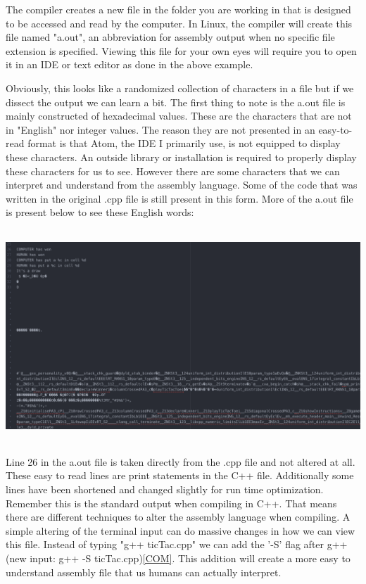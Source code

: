 \documentclass{article}
\theoremstyle{theorem}
\theoremstyle{definition}
\theoremstyle{remark}
\begin{document}
The compiler creates a new file in the folder you are working in that is designed to be accessed and read by the computer. In Linux, the compiler will create this file named "a.out", an abbreviation for assembly output when no specific file extension is specified. Viewing this file for your own eyes will require you to open it in an IDE or text editor as done in the above example. 

Obviously, this looks like a randomized collection of characters in a file but if we dissect the output we can learn a  bit. The first thing to note is the a.out file is mainly constructed of hexadecimal values. These are the characters that are not in "English" nor integer values. The reason they are not presented in an easy-to-read format is that Atom, the IDE I primarily use, is not equipped to display these characters. An outside library or installation is required to properly display these characters for us to see. However there are some characters that we can interpret and understand from the assembly language. Some of the code that was written in the original .cpp file is still present in this form. More of the a.out file is present below to see these English words:

\medskip\begin{center}
\includegraphics[width=16cm, height=8cm]{Pic3.png}
\end{center}

Line 26 in the a.out file is taken directly from the .cpp file and not altered at all. These easy to read lines are print statements in the C++ file. Additionally some lines have been shortened and changed slightly for run time optimization. Remember this is the standard output when compiling in C++. That means there are different techniques to alter the assembly language when compiling. A simple altering of the terminal input can do massive changes in how we can view this file. Instead of typing "g++ ticTac.cpp" we can add the '-S' flag after g++ (new input: g++ -S ticTac.cpp)\href{https://www.geeksforgeeks.org/compiling-with-g-plus-plus/}{[COM]}. This addition will create a more easy to understand assembly file that us humans can actually interpret.
\end{document}
